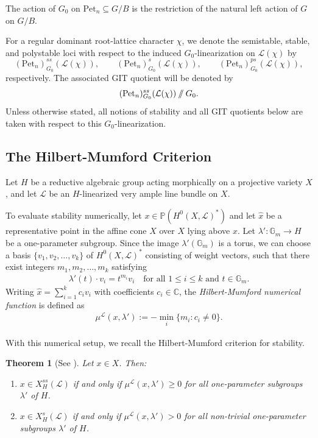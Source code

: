 \documentclass[12pt, reqno]{amsart}
\newcommand{\sslash}{\mathbin{/\mkern-6mu/}}
\theoremstyle{plain}
\numberwithin{equation}{section}
\newtheorem{theorem}{Theorem}[section]
\theoremstyle{definition}
\begin{document}
The action of \(G_0\) on \(\mathrm{Pet}_n\subseteq G/B\) is the
restriction of the natural left action of \(G\) on \(G/B\).

For a regular dominant root-lattice character \(\chi\), we denote the
semistable, stable, and polystable loci with respect to the induced
\(G_0\)-linearization on \(\mathcal L(\chi)\) by
\[
(\mathrm{Pet}_n)^{ss}_{G_0}(\mathcal L(\chi)),
\qquad
(\mathrm{Pet}_n)^{s}_{G_0}(\mathcal L(\chi)),
\qquad
(\mathrm{Pet}_n)^{ps}_{G_0}(\mathcal L(\chi)),
\]
respectively. The associated GIT quotient will be denoted by
\[
(\mathrm{Pet}_n)^{ss}_{G_0}(\mathcal L(\chi))
\sslash G_0.
\]
Unless otherwise stated, all notions of stability and all GIT quotients
below are taken with respect to this \(G_0\)-linearization.

\subsection{The Hilbert-Mumford Criterion}

Let $H$ be a reductive algebraic group acting morphically on a projective variety $X$, and let $\mathcal{L}$ be an $H$-linearized very ample line bundle on $X$.

To evaluate stability numerically, let $x \in \mathbb{P}(H^0(X, \mathcal{L})^*)$ and let $\hat{x}$ be a representative point in the affine cone $\hat{X}$ over $X$ lying above $x$. Let $\lambda' \colon \mathbb{G}_m \to H$ be a one-parameter subgroup. Since the image $\lambda'(\mathbb{G}_m)$ is a torus, we can choose a basis $\{v_1, v_2, \ldots, v_k\}$ of $H^0(X, \mathcal{L})^*$ consisting of weight vectors, such that there exist integers $m_1, m_2, \ldots, m_k$ satisfying
\begin{align*}
    \lambda'(t) \cdot v_i = t^{m_i} v_i \quad \text{for all } 1 \leq i \leq k \text{ and } t \in \mathbb{G}_m.
\end{align*}
Writing $\hat{x} = \sum_{i=1}^k c_i v_i$ with coefficients $c_i \in \mathbb{C}$, the \textit{Hilbert-Mumford numerical function} is defined as
\begin{align*}
    \mu^{\mathcal{L}}(x, \lambda') := -\min_i \{ m_i : c_i \neq 0 \}.
\end{align*}

With this numerical setup, we recall the Hilbert-Mumford criterion for stability.

\begin{theorem}[{See \cite[Theorem 2.1]{GIT}}]\label{HM theorem for G}
    Let $x \in X$. Then:
    \begin{enumerate}
        \item $x \in X^{ss}_H(\mathcal{L})$ if and only if $\mu^{\mathcal{L}}(x, \lambda') \geq 0$ for all one-parameter subgroups $\lambda'$ of $H$.
        \item $x \in X^s_H(\mathcal{L})$ if and only if $\mu^{\mathcal{L}}(x, \lambda') > 0$ for all non-trivial one-parameter subgroups $\lambda'$ of $H$.
    \end{enumerate}
\end{theorem}
\end{document}
